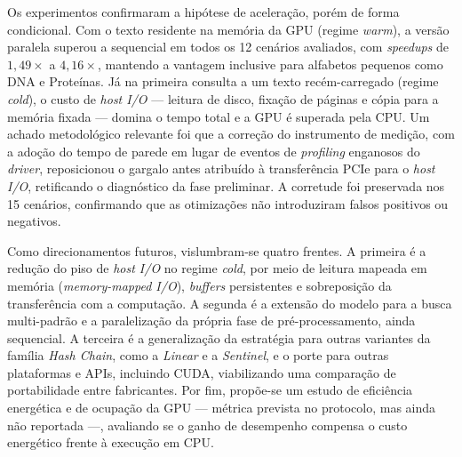 \documentclass[12pt]{article}
\begin{document}
Os experimentos confirmaram a hipótese de aceleração, porém de forma condicional. Com o texto residente na memória da GPU (regime \textit{warm}), a versão paralela superou a sequencial em todos os 12 cenários avaliados, com \textit{speedups} de $1{,}49\times$ a $4{,}16\times$, mantendo a vantagem inclusive para alfabetos pequenos como DNA e Proteínas. Já na primeira consulta a um texto recém-carregado (regime \textit{cold}), o custo de \textit{host I/O} — leitura de disco, fixação de páginas e cópia para a memória fixada — domina o tempo total e a GPU é superada pela CPU. Um achado metodológico relevante foi que a correção do instrumento de medição, com a adoção do tempo de parede em lugar de eventos de \textit{profiling} enganosos do \textit{driver}, reposicionou o gargalo antes atribuído à transferência PCIe para o \textit{host I/O}, retificando o diagnóstico da fase preliminar. A corretude foi preservada nos 15 cenários, confirmando que as otimizações não introduziram falsos positivos ou negativos.

Como direcionamentos futuros, vislumbram-se quatro frentes. A primeira é a redução do piso de \textit{host I/O} no regime \textit{cold}, por meio de leitura mapeada em memória (\textit{memory-mapped I/O}), \textit{buffers} persistentes e sobreposição da transferência com a computação. A segunda é a extensão do modelo para a busca multi-padrão e a paralelização da própria fase de pré-processamento, ainda sequencial. A terceira é a generalização da estratégia para outras variantes da família \textit{Hash Chain}, como a \textit{Linear} e a \textit{Sentinel}, e o porte para outras plataformas e APIs, incluindo CUDA, viabilizando uma comparação de portabilidade entre fabricantes. Por fim, propõe-se um estudo de eficiência energética e de ocupação da GPU — métrica prevista no protocolo, mas ainda não reportada —, avaliando se o ganho de desempenho compensa o custo energético frente à execução em CPU.


\newpage


\end{document}
